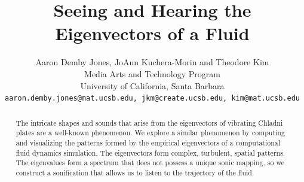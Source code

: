 \documentclass[11pt]{article}
\title{Seeing and Hearing the Eigenvectors of a Fluid}
\author{ Aaron Demby Jones, JoAnn Kuchera-Morin and Theodore Kim\\
Media Arts and Technology Program\\ University of California, Santa Barbara\\
{\tt aaron.demby.jones@mat.ucsb.edu, jkm@create.ucsb.edu, kim@mat.ucsb.edu}
}
\date{}				%
\begin{document}
\newcommand{\UU}{\mathbf{U}}
\newcommand{\uu}{\mathbf{u}}
\newcommand{\vv}{\mathbf{v}}
\newcommand{\utilde}{\mathbf{q}}
\newcommand{\ff}{\mathbf{f}}
\newcommand{\qq}{\mathbf{q}}
\newcommand{\aaa}{\mathbf{a}}
\newcommand{\R}{\mathbb{R}}
\newcommand{\todo}[1]{$\spadesuit$ {\bf #1} $\spadesuit$}


\maketitle

\thispagestyle{empty}

\begin{abstract}
The intricate shapes and sounds that arise from the eigenvectors of vibrating Chladni plates are a well-known phenomenon. We explore a similar phenomenon by computing and visualizing the patterns formed by the empirical eigenvectors of a computational fluid dynamics simulation. The eigenvectors form complex, turbulent, spatial patterns. The eigenvalues form a spectrum that does not possess a unique sonic mapping, so we construct a sonification that allows us to listen to the trajectory of the fluid.
\end{abstract}


\end{document}
